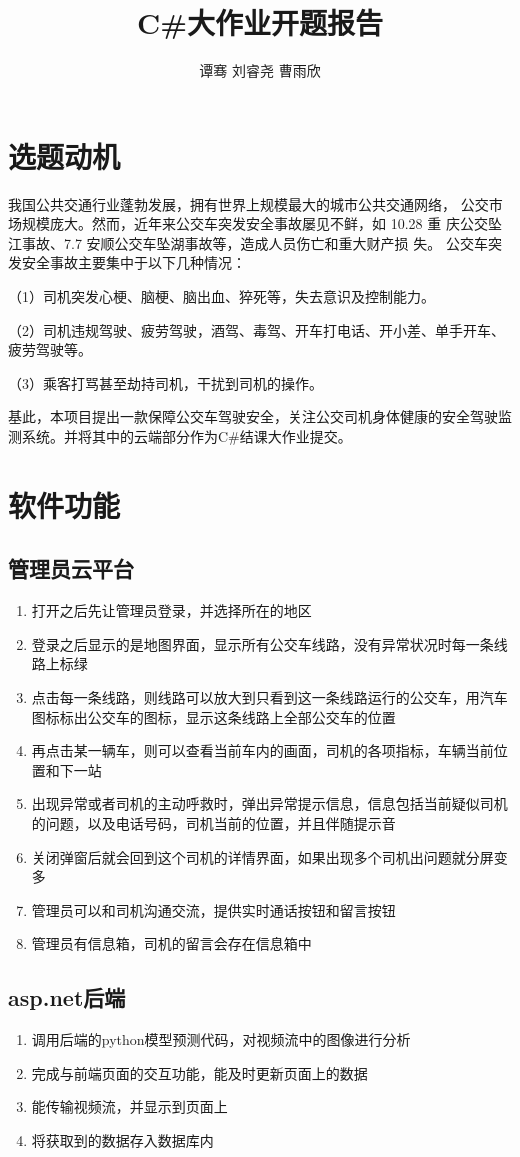 \documentclass{article}
\title{C\#大作业开题报告}
\author{谭骞 \quad 刘睿尧 \quad 曹雨欣}
\date{}
\begin{document}
\maketitle
\section*{选题动机}
我国公共交通行业蓬勃发展，拥有世界上规模最大的城市公共交通网络， 公交市场规模庞大。然而，近年来公交车突发安全事故屡见不鲜，如 10.28 重 庆公交坠江事故、7.7 安顺公交车坠湖事故等，造成人员伤亡和重大财产损 失。 公交车突发安全事故主要集中于以下几种情况： 

（1）司机突发心梗、脑梗、脑出血、猝死等，失去意识及控制能力。 

（2）司机违规驾驶、疲劳驾驶，酒驾、毒驾、开车打电话、开小差、单手开车、疲劳驾驶等。 

（3）乘客打骂甚至劫持司机，干扰到司机的操作。 

基此，本项目提出一款保障公交车驾驶安全，关注公交司机身体健康的安全驾驶监测系统。并将其中的云端部分作为C\#结课大作业提交。
\section*{软件功能}
\subsection*{管理员云平台}
\begin{enumerate}
\item 打开之后先让管理员登录，并选择所在的地区
\item 登录之后显示的是地图界面，显示所有公交车线路，没有异常状况时每一条线路上标绿
\item 点击每一条线路，则线路可以放大到只看到这一条线路运行的公交车，用汽车图标标出公交车的图标，显示这条线路上全部公交车的位置
\item 再点击某一辆车，则可以查看当前车内的画面，司机的各项指标，车辆当前位置和下一站
\item 出现异常或者司机的主动呼救时，弹出异常提示信息，信息包括当前疑似司机的问题，以及电话号码，司机当前的位置，并且伴随提示音
\item 关闭弹窗后就会回到这个司机的详情界面，如果出现多个司机出问题就分屏变多
\item 管理员可以和司机沟通交流，提供实时通话按钮和留言按钮
\item 管理员有信息箱，司机的留言会存在信息箱中
\end{enumerate}
\subsection*{asp.net后端}
\begin{enumerate}
\item 调用后端的python模型预测代码，对视频流中的图像进行分析
\item 完成与前端页面的交互功能，能及时更新页面上的数据
\item 能传输视频流，并显示到页面上
\item 将获取到的数据存入数据库内
\end{enumerate}
\end{document}
